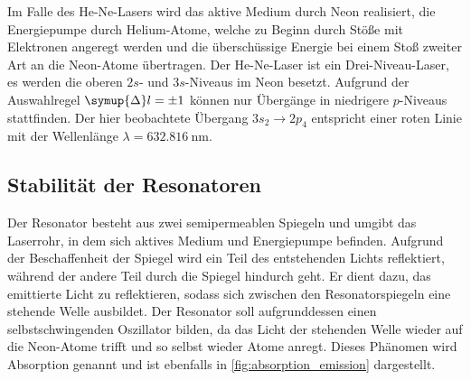     Im Falle des He-Ne-Lasers wird das aktive Medium durch Neon realisiert,
    die Energiepumpe durch Helium-Atome,
    welche zu Beginn durch Stöße mit Elektronen angeregt werden und die überschüssige Energie bei einem Stoß zweiter Art an die Neon-Atome übertragen.
    Der He-Ne-Laser ist ein Drei-Niveau-Laser,
    es werden die oberen $2s$- und $3s$-Niveaus im Neon besetzt.
    Aufgrund der Auswahlregel $\symup{\Delta} l = \pm 1$ können nur Übergänge in niedrigere $p$-Niveaus stattfinden.
    Der hier beobachtete Übergang $3s_2 \to 2p_4$ entspricht einer roten Linie mit der Wellenlänge $\lambda = \SI{632.816}{\nano\meter}$.

\subsection{Stabilität der Resonatoren}
\label{sec:stabilitaet}

    Der Resonator besteht aus zwei semipermeablen Spiegeln und umgibt das Laserrohr,
    in dem sich aktives Medium und Energiepumpe befinden.
    Aufgrund der Beschaffenheit der Spiegel wird ein Teil des entstehenden Lichts reflektiert,
    während der andere Teil durch die Spiegel hindurch geht.
    Er dient dazu,
    das emittierte Licht zu reflektieren,
    sodass sich zwischen den Resonatorspiegeln eine stehende Welle ausbildet.
    Der Resonator soll aufgrunddessen einen selbstschwingenden Oszillator bilden,
    da das Licht der stehenden Welle wieder auf die Neon-Atome trifft und so selbst wieder Atome anregt.
    Dieses Phänomen wird Absorption genannt und ist ebenfalls in \autoref{fig:absorption_emission} dargestellt.

